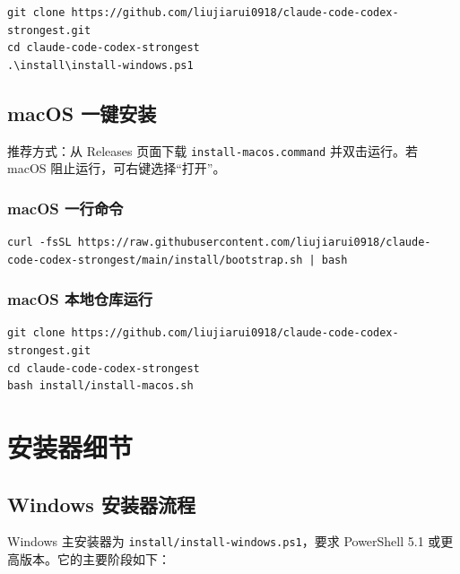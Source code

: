 \documentclass[11pt,a4paper]{ctexbook}
\begin{document}
\begin{lstlisting}[language={}]
git clone https://github.com/liujiarui0918/claude-code-codex-strongest.git
cd claude-code-codex-strongest
.\install\install-windows.ps1
\end{lstlisting}

\section{macOS 一键安装}

推荐方式：从 Releases 页面下载 \texttt{install-macos.command} 并双击运行。若 macOS 阻止运行，可右键选择“打开”。

\subsection{macOS 一行命令}

\begin{lstlisting}[language={}]
curl -fsSL https://raw.githubusercontent.com/liujiarui0918/claude-code-codex-strongest/main/install/bootstrap.sh | bash
\end{lstlisting}

\subsection{macOS 本地仓库运行}

\begin{lstlisting}[language={}]
git clone https://github.com/liujiarui0918/claude-code-codex-strongest.git
cd claude-code-codex-strongest
bash install/install-macos.sh
\end{lstlisting}

\chapter{安装器细节}

\section{Windows 安装器流程}

Windows 主安装器为 \texttt{install/install-windows.ps1}，要求 PowerShell 5.1 或更高版本。它的主要阶段如下：
\end{document}
